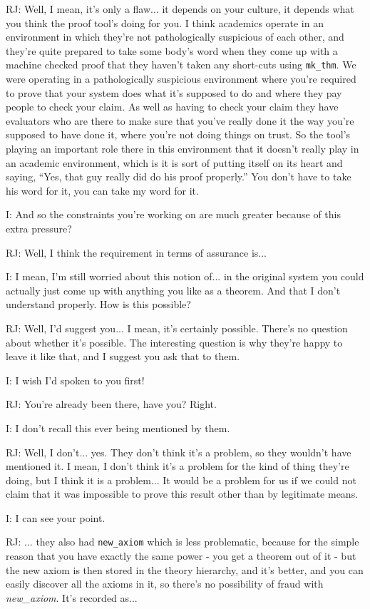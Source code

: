 \documentclass[10pt,titlepage]{book}
\begin{document}
RJ: Well, I mean, it's only a flaw... it depends on your culture, it depends what you think the proof tool's doing for you.
I think academics operate in an environment in which they're not pathologically suspicious of each other, and they're quite prepared to take some body's word when they come up with a machine checked proof that they haven't taken any short-cuts using {\tt mk\_thm}.
We were operating in a pathologically suspicious environment where you're required to prove that your system does what it's supposed to do and where they pay people to check your claim.
As well as having to check your claim they have evaluators who are there to make sure that you've really done it the way you're supposed to have done it, where you're not doing things on trust.
So the tool's playing an important role there in this environment that it doesn't really play in an academic environment, which is it is sort of putting itself on its heart and saying, ``Yes, that guy really did do his proof properly.''
You don't have to take his word for it, you can take my word for it.

I: And so the constraints you're working on are much greater because of this extra pressure?

RJ: Well, I think the requirement in terms of assurance is...

I: I mean, I'm still worried about this notion of... in the original system you could actually just come up with anything you like as a theorem.
And that I don't understand properly.
How is this possible?

RJ: Well, I'd suggest you... I mean, it's certainly possible.
There's no question about whether it's possible.
The interesting question is why they're happy to leave it like that, and I suggest you ask that to them.

I: I wish I'd spoken to you first!

RJ: You're already been there, have you?
Right.

I: I don't recall this ever being mentioned by them.

RJ: Well, I don't... yes.
They don't think it's a problem, so they wouldn't have mentioned it.
I mean, I don't think it's a problem for the kind of thing they're doing, but I think it is a problem...
It would be a problem for us if we could not claim that it was impossible to prove this result other than by legitimate means.

I: I can see your point.

RJ: 	... they also had {\tt new\_axiom} which is less problematic, because for the simple reason that you have exactly the same power - you get a theorem out of it - but the new axiom is then stored in the theory hierarchy, and it's better, and you can easily discover all the axioms in it, so there's no possibility of fraud with {\it new\_axiom}.
It's recorded as...
\end{document}
